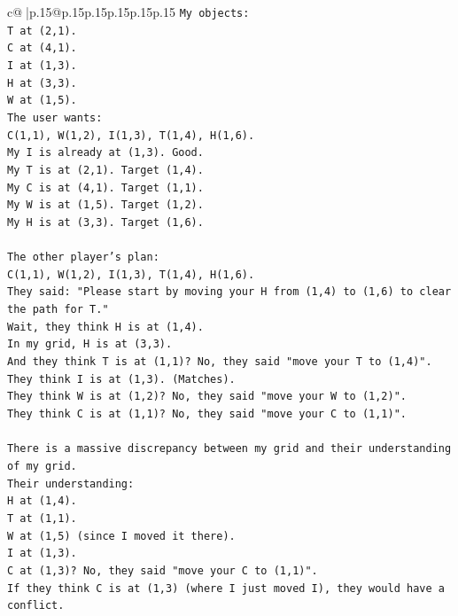 \documentclass{article}
\begin{document}
{\begin{supertabular}{c@{$\;$}|p{.15\linewidth}@{}p{.15\linewidth}p{.15\linewidth}p{.15\linewidth}p{.15\linewidth}p{.15\linewidth}}
{{{\texttt{My objects:} \\
\texttt{T at (2,1).} \\
\texttt{C at (4,1).} \\
\texttt{I at (1,3).} \\
\texttt{H at (3,3).} \\
\texttt{W at (1,5).} \\
\texttt{The user wants:} \\
\texttt{C(1,1), W(1,2), I(1,3), T(1,4), H(1,6).} \\
\texttt{My I is already at (1,3). Good.} \\
\texttt{My T is at (2,1). Target (1,4).} \\
\texttt{My C is at (4,1). Target (1,1).} \\
\texttt{My W is at (1,5). Target (1,2).} \\
\texttt{My H is at (3,3). Target (1,6).} \\
\\ 
\texttt{The other player's plan:} \\
\texttt{C(1,1), W(1,2), I(1,3), T(1,4), H(1,6).} \\
\texttt{They said: "Please start by moving your H from (1,4) to (1,6) to clear the path for T."} \\
\texttt{Wait, they think H is at (1,4).} \\
\texttt{In my grid, H is at (3,3).} \\
\texttt{And they think T is at (1,1)? No, they said "move your T to (1,4)".} \\
\texttt{They think I is at (1,3). (Matches).} \\
\texttt{They think W is at (1,2)? No, they said "move your W to (1,2)".} \\
\texttt{They think C is at (1,1)? No, they said "move your C to (1,1)".} \\
\\ 
\texttt{There is a massive discrepancy between my grid and their understanding of my grid.} \\
\texttt{Their understanding:} \\
\texttt{H at (1,4).} \\
\texttt{T at (1,1).} \\
\texttt{W at (1,5) (since I moved it there).} \\
\texttt{I at (1,3).} \\
\texttt{C at (1,3)? No, they said "move your C to (1,1)".} \\
\texttt{If they think C is at (1,3) (where I just moved I), they would have a conflict.} \\
}}}
\end{supertabular}}
\end{document}
